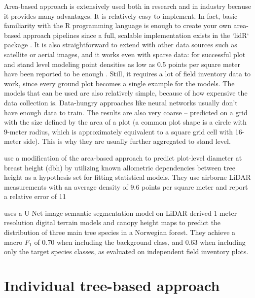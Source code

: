 Area-based approach is extensively used both in research and in industry because it provides many advantages.
It is relatively easy to implement.
In fact, basic familiarity with the R programming language is enough to create your own area-based approach pipelines since a full, scalable implementation exists in the `lidR` package \cite{rousselLidRPackage2020}.
It is also straightforward to extend with other data sources such as satellite or aerial images, and it works even with sparse data: for successful plot and stand level modeling point densities as low as 0.5 points per square meter have been reported to be enough \cite{treitzLiDARSamplingDensity2012, jakubowskiTradeoffsLidarPulse2013}.
Still, it requires a lot of field inventory data to work, since every ground plot becomes a single example for the models.
The models that can be used are also relatively simple, because of how expensive the data collection is.
Data-hungry approaches like neural networks usually don't have enough data to train.
The results are also very coarse – predicted on a grid with the size defined by the area of a plot (a common plot shape is a circle with 9-meter radius, which is approximately equivalent to a square grid cell with 16-meter side).
This is why they are usually further aggregated to stand level.

\cite{bouvierGeneralizingPredictiveModels2015}

\cite{zhangImprovedAreabasedApproach2023} use a modification of the area-based approach to predict plot-level diameter at breast height (dbh) by utilizing known allometric dependencies between tree height as a hypothesis set for fitting statistical models.
They use airborne LiDAR measurements with an average density of 9.6 points per square meter and report a relative error of 11%

\cite{vermeerLidarbasedNorwegianTree2023} uses a U-Net \cite{ronnebergerUNetConvolutionalNetworks2015} image semantic segmentation model on LiDAR-derived 1-meter resolution digital terrain models and canopy height maps to predict the distribution of three main tree species in a Norwegian forest.
They achieve a macro $F_1$ of 0.70 when including the background class, and 0.63 when including only the target species classes, as evaluated on independent field inventory plots.

\cite{kcEstimationAboveGroundForest2024}

\section{Individual tree-based approach}\label{sec-individual-tree-approach}

